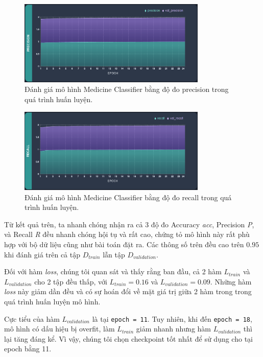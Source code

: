 \begin{figure}
\centering
\includegraphics[width=0.8\textwidth]{mep_img/tfw_precision.png}
\caption{Đánh giá mô hình Medicine Classifier bằng độ đo precision trong quá trình huấn luyện.}\label{tfw_precision}
\end{figure}

\begin{figure}
\centering
\includegraphics[width=0.8\textwidth]{mep_img/tfw_recall.png}
\caption{Đánh giá mô hình Medicine Classifier bằng độ đo recall trong quá trình huấn luyện.}\label{tfw_recall}
\end{figure}

Từ kết quả trên, ta nhanh chóng nhận ra cả 3 độ đo Accuracy \textit{acc}, Precision \textit{P}, và Recall \textit{R} đều nhanh chóng hội tụ và rất cao, chứng tỏ mô hình này rất phù hợp với bộ dữ liệu cũng như bài toán đặt ra. Các thông số trên đều cao trên $0.95$ khi đánh giá trên cả tập $D_{train}$ lẫn tập $D_{validation}$.

Đối với hàm \textit{loss}, chúng tôi quan sát và thấy rằng ban đầu, cả 2 hàm $L_{train}$ và $L_{validation}$ cho 2 tập đều thấp, với $L_{train} = 0.16$ và $L_{validation} = 0.09$. Những hàm \textit{loss} này giảm dần đều và có sự hoán đổi về mặt giá trị giữa 2 hàm trong trong quá trình huấn luyện mô hình. 

Cực tiểu của hàm $L_{validation}$ là tại \verb|epoch = 11|. Tuy nhiên, khi đến \verb|epoch = 18|, mô hình có dấu hiệu bị overfit, làm $L_{train}$ giảm nhanh nhưng hàm $L_{validation}$ thì lại tăng đáng kể. Vì vậy, chúng tôi chọn checkpoint tốt nhất để sử dụng cho  tại epoch bằng 11.

